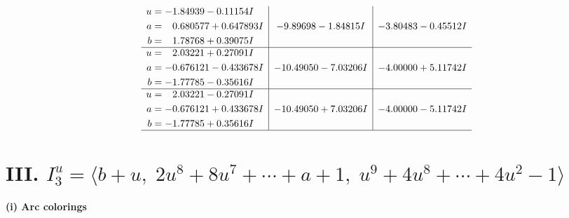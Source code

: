 \documentclass[1p]{elsarticle_modified}
\theoremstyle{definition}
\begin{document}
$$\begin{array}{c|c|c}
\begin{aligned}
u &= -1.84939 - 0.11154 I \\
a &= \phantom{-}0.680577 + 0.647893 I \\
b &= \phantom{-}1.78768 + 0.39075 I\end{aligned}
 & -9.89698 - 1.84815 I & -3.80483 - 0.45512 I \\ \hline\begin{aligned}
u &= \phantom{-}2.03221 + 0.27091 I \\
a &= -0.676121 - 0.433678 I \\
b &= -1.77785 - 0.35616 I\end{aligned}
 & -10.49050 - 7.03206 I & -4.00000 + 5.11742 I \\ \hline\begin{aligned}
u &= \phantom{-}2.03221 - 0.27091 I \\
a &= -0.676121 + 0.433678 I \\
b &= -1.77785 + 0.35616 I\end{aligned}
 & -10.49050 + 7.03206 I & -4.00000 - 5.11742 I\\
 \hline 
 \end{array}$$\newpage\newpage\renewcommand{\arraystretch}{1}
\centering \section*{III. $I^u_{3}= \langle b+u,\;2 u^8+8 u^7+\cdots+a+1,\;u^9+4 u^8+\cdots+4 u^2-1 \rangle$}
\flushleft \textbf{(i) Arc colorings}\\
\end{document}
